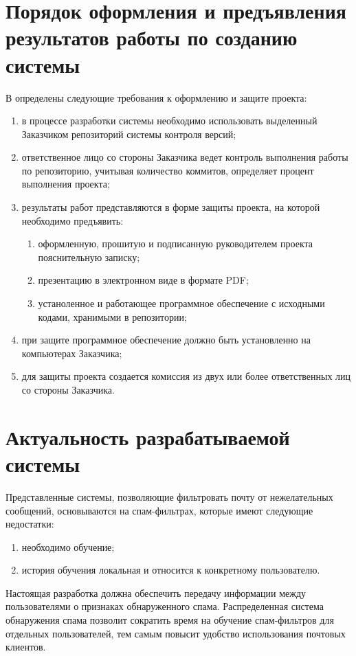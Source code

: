 \section{Порядок оформления и предъявления результатов работы по созданию системы}
В \cite{metodKKrishenko} определены следующие требования к оформлению и защите проекта:

\begin{enumerate}
	\item в процессе разработки системы необходимо использовать выделенный Заказчиком репозиторий системы контроля версий;
	\item ответственное лицо со стороны Заказчика ведет контроль выполнения работы по репозиторию, учитывая количество коммитов, определяет процент выполнения проекта;
	\item результаты работ представляются в форме защиты проекта, на которой необходимо предъявить:
		\begin{enumerate}
			\item оформленную, прошитую и подписанную руководителем проекта пояснительную записку;
			\item презентацию в электронном виде в формате PDF;
			\item устаноленное и работающее программное обеспечение с исходными кодами, хранимыми в репозитории;
		\end{enumerate}
	\item при защите программное обеспечение должно быть установленно на компьютерах Заказчика;
	\item для защиты проекта создается комиссия из двух или более ответственных лиц со стороны Заказчика.
\end{enumerate}


\section{Актуальность разрабатываемой системы}
Представленные системы, позволяющие фильтровать почту от нежелательных сообщений, основываются на спам-фильтрах, которые имеют следующие недостатки:

\begin{enumerate}
\item{необходимо обучение;}
\item{история обучения локальная и относится к конкретному пользователю.}
\end{enumerate}

Настоящая разработка должна обеспечить передачу информации между пользователями о признаках обнаруженного спама. Распределенная система обнаружения спама позволит сократить время на обучение спам-фильтров для отдельных пользователей, тем самым повысит удобство использования почтовых клиентов.



